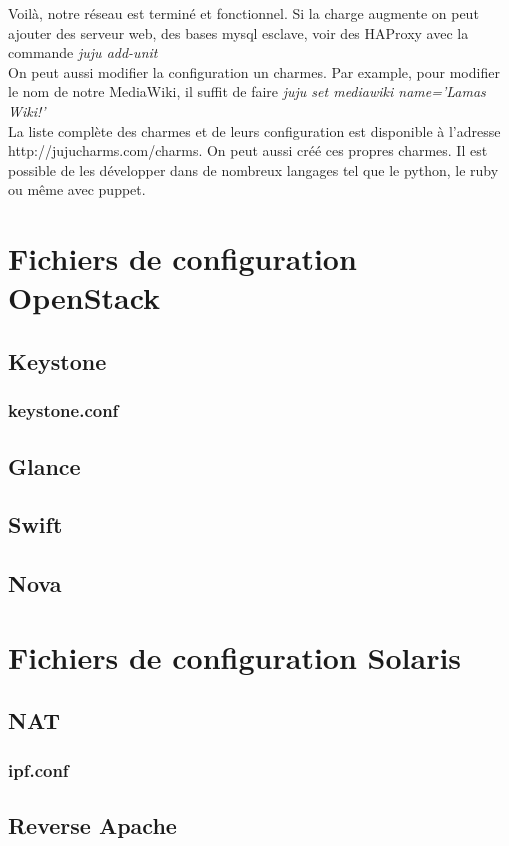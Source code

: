 \documentclass[a4paper,oneside]{report}
\begin{document}
Voilà, notre réseau est terminé et fonctionnel. Si la charge augmente on peut ajouter des serveur web, des bases mysql esclave, voir des HAProxy avec la commande \emph{juju add-unit}\\
On peut aussi modifier la configuration un charmes. Par example, pour modifier le nom de notre MediaWiki, il suffit de faire \emph{juju set mediawiki name='Lamas Wiki!'}\\
La liste complète des charmes et de leurs configuration est disponible à l'adresse http://jujucharms.com/charms.
On peut aussi créé ces propres charmes. Il est possible de les développer dans de nombreux langages tel que le python, le ruby ou même avec puppet.

\chapter{Fichiers de configuration OpenStack}
\section{Keystone}
\subsection{keystone.conf}

\section{Glance}

\section{Swift}

\section{Nova}

\chapter{Fichiers de configuration Solaris}
\section{NAT}
\subsection{ipf.conf} \label{conf:NAT}
\section{Reverse Apache} \label{conf:apacheProxy}
\end{document}

